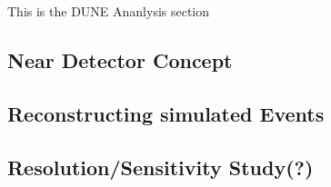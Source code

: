 This is the DUNE Ananlysis section

\subsection{Near Detector Concept}
\subsection{Reconstructing simulated Events}
\subsection{Resolution/Sensitivity Study(?)}